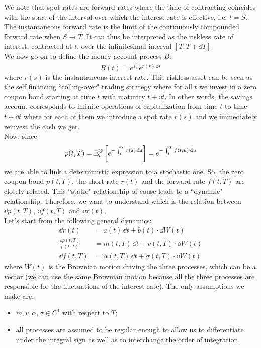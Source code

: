 We note that spot rates are forward rates where the time of contracting coincides with the start of the interval over which the interest rate is effective, i.e. $t = S$. The instantaneous forward rate is the limit of the continuously compounded forward rate when $S \to T$. It can thus be interpreted as the riskless rate of interest, contracted at $t$, over the infinitesimal interval $[T,T +\dd T]$.\\
We now go on to define the money account process $B$:
\begin{equation}
    B(t) = e^{\int_0^t} e^{r(s)\,\dd s}
\end{equation}
where $r(s)$ is the instantaneous interest rate. This riskless asset can be seen as the self financing ``rolling-over" trading strategy where for all $t$ we invest in a zero coupon bond starting at time $t$ with maturity $t+\dd t$. In other words, the savings account corresponds to infinite operations of capitalization from time $t$ to time $t+\dd t$ where for each of them we introduce a spot rate $r(s)$ and we immediately reinvest the cash we get. \\
Now, since
\begin{equation}
    p(t,T) = \mathbb{E}^{\mathbb{Q}}_t\left[e^{-\int_t^T r(s)\,\dd s}\right] = e^{-\int_t^T f(t,u)\,\dd u}
\end{equation}
we are able to link a deterministic expression to a stochastic one. So, the zero coupon bond $p(t,T)$, the short rate $r(t)$ and the forward rate $f(t,T)$ are closely related. This ``static" relationship of couse leads to a ``dynamic" relationship. Therefore, we want to understand which is the relation between $\dd p(t,T)$, $\dd f(t,T)$ and $\dd r(t)$.\\
Let's start from the following general dynamics:
\begin{align}
    \dd r(t) &= a(t)\,\dd t + b(t)\cdot \dd W(t) \\
    \frac{\dd p(t,T)}{p(t,T)} &= m(t,T)\,\dd t + v(t,T)\cdot \dd W(t) \label{zcbdyn} \\
    \dd f(t,T) &= \alpha(t,T)\,\dd t + \sigma(t,T)\cdot \dd W(t)
\end{align}
where $W(t)$ is the Brownian motion driving the three processes, which can be a vector (we can use the same Brownian motion because all the three processes are responsible for the fluctuations of the interest rate). The only assumptions we make are:
\begin{itemize}
    \item $m, v, \alpha, \sigma \in C^1$ with respect to $T$;
    \item all processes are assumed to be regular enough to allow us to differentiate under the integral sign as well as to interchange the order of integration.
\end{itemize}
